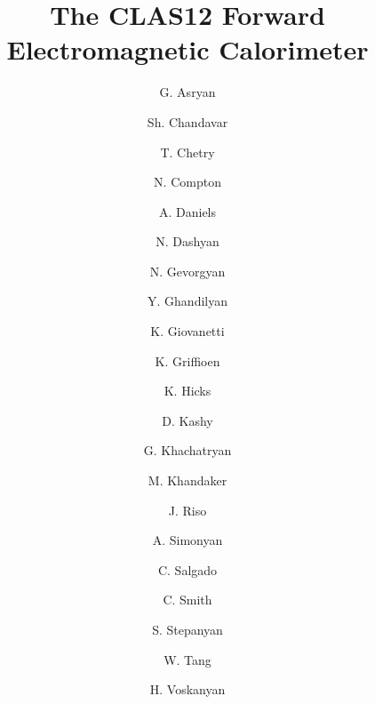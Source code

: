 \title{The CLAS12 Forward Electromagnetic Calorimeter}

\author[YerPi]{G. Asryan}
\author[Ohio]{Sh. Chandavar}
\author[Ohio]{T. Chetry}
\author[Ohio]{N. Compton}
\author[Ohio]{A. Daniels}
\author[YerPi]{N. Dashyan}
\author[YerPi]{N. Gevorgyan}
\author[YerPi]{Y. Ghandilyan}
\author[JMU]{K. Giovanetti}
\author[WmM]{K. Griffioen}
\author[Ohio]{K. Hicks}
\author[JLAB] {D. Kashy}
\author[YerPi]{G. Khachatryan}
\author[NSU]{M. Khandaker}
\author[WmM]{J. Riso}
\author[YerPi]{A. Simonyan}
\author[NSU] {C. Salgado}
\author[UVA]{C. Smith}
\author[JLAB]{S. Stepanyan}
\author[Ohio]{W. Tang}
\author[YerPi]{H. Voskanyan}

\address[JLAB]{Thomas Jefferson National Accelerator Facility, 
Newport News, VA 23606, USA}
\address[WmM]{The College of William and Mary, Williamsburg, VA 23185, USA}
\address[Ohio]{Ohio University, Athens, OH 4570, USA} 
\address[NSU] {Norfolk State University, Norfolk, VA 23504, USA}
\address[UVA]{University of Virginia, Charlottesville, VA 22901, USA}
\address[YerPi]{A. Alikhanyan National Science Laboratory,  Yerevan, 375036, Armenia}
\address[JMU]{James Madison University, Harrisonburg, VA , USA}

